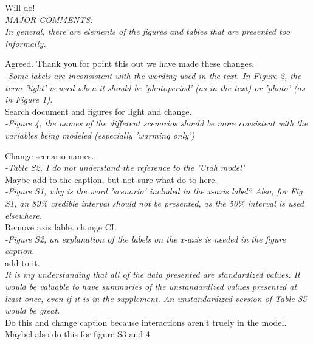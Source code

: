 \documentclass[11pt]{article}
\begin{document}
Will do!\\

\emph{MAJOR COMMENTS:\\
In general, there are elements of the figures and tables that are presented too informally.}

Agreed. Thank you for point this out we have made these changes.\\

\emph{-Some labels are inconsistent with the wording used in the text. In Figure 2, the term 'light' is used when it should be 'photoperiod' (as in the text) or 'photo' (as in Figure 1).}\\

Search document and figures for light and change.\\

\emph{-Figure 4, the names of the different scenarios should be more consistent with the variables being modeled (especially 'warming only')}

Change scenario names.\\

\emph{-Table S2, I do not understand the reference to the 'Utah model'}\\

Maybe add to the caption, but not sure what do to here.\\


\emph{-Figure S1, why is the word 'scenario' included in the x-axis label? Also, for Fig S1, an 89\% credible interval should not be presented, as the 50\% interval is used elsewhere.}\\

Remove axis lable. change CI.\\

\emph{-Figure S2, an explanation of the labels on the x-axis is needed in the figure caption.}\\

add to it.\\


\emph{It is my understanding that all of the data presented are standardized values. It would be valuable to have summaries of the unstandardized values presented at least once, even if it is in the supplement. An unstandardized version of Table S5 would be great.}\\

Do this and change caption because interactions aren't truely in the model. Maybel also do this for figure S3 and 4\\ 
\end{document}

